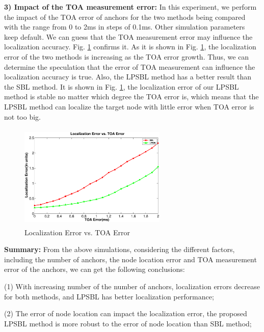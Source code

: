 \textbf{3) Impact of the TOA measurement error:}
In this experiment, we perform the impact of the TOA error of anchors for the two methods being compared with the range from 0 to 2ms in steps of 0.1ms. 
Other simulation parameters keep default. 
We can guess that the TOA measurement error may influence the localization accuracy. 
Fig. \ref{fig6} confirms it. As it is shown in Fig. \ref{fig6}, the localization error of the  two methods is increasing as the TOA error growth. 
Thus, we can determine the speculation that the error of TOA measurement can influence the localization accuracy is true. 
Also, the LPSBL method has a better result than the SBL method. 
It is shown in Fig. \ref{fig6}, the localization error of our LPSBL method is stable no matter which degree the TOA error is, which means that the LPSBL method can localize the target node with little error when TOA error is not too big.
  \begin{figure}[htb]       
			\vspace{-15mm}
            \includegraphics[height=5.0cm,width=7.0cm]{image/fig6.eps}
           \vspace{15mm}
            \caption{Localization Error vs. TOA Error}
             \vspace{-5mm}
             \label{fig6}
        \end{figure}
		
 \textbf{Summary:} From the above simulations, considering the different factors, including the number of anchors, the node location error and TOA measurement error of the anchors, we can get the following conclusions:

 (1) With increasing number of the number of anchors, localization errors decrease for both methods, and LPSBL has better localization performance;

 (2) The error of node location can impact the localization error, the proposed LPSBL method is more robust to the error of node location than SBL method;
 
